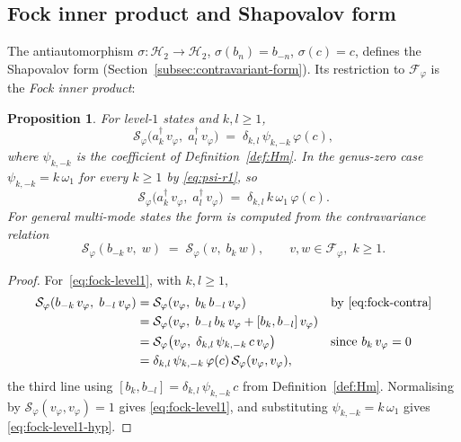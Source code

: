 \documentclass[12pt]{amsart}
\theoremstyle{plain}
\newtheorem{proposition}[theorem]{Proposition}
\theoremstyle{definition}
\newcommand{\Sf}{\mathcal{S}_\varphi} %
\newcommand{\vf}{v_\varphi}           %
\begin{document}
\subsection{Fock inner product and Shapovalov form}
\label{subsec:fock-inner-product}

The antiautomorphism $\sigma\colon \mathcal{H}_2 \to \mathcal{H}_2$,
$\sigma(b_n) = b_{-n}$, $\sigma(c) = c$, defines the Shapovalov form
(Section~\ref{subsec:contravariant-form}).
Its restriction to $\mathcal{F}_\varphi$ is the \emph{Fock inner product}:

\begin{proposition}
\label{prop:fock-ip}
For level-$1$ states and $k, l \geq 1$,
\begin{equation}
\label{eq:fock-level1}
  \Sf\bigl(a_k^\dagger\, \vf,\; a_l^\dagger\, \vf\bigr)
  \;=\;
  \delta_{k,l}\, \psi_{k,-k}\, \varphi(c),
\end{equation}
where $\psi_{k,-k}$ is the coefficient of
Definition~\textup{\ref{def:Hm}}. In the genus-zero case
$\psi_{k,-k} = k\,\omega_1$ for every $k \geq 1$ by \eqref{eq:psi-r1}, so
\begin{equation}
\label{eq:fock-level1-hyp}
  \Sf\bigl(a_k^\dagger\, \vf,\; a_l^\dagger\, \vf\bigr)
  \;=\;
  \delta_{k,l}\, k\, \omega_1 \, \varphi(c).
\end{equation}
For general multi-mode states the form is computed from the
contravariance relation
\begin{equation}
\label{eq:fock-contra}
  \Sf(b_{-k}\,v,\; w) \;=\; \Sf(v,\; b_k\,w),
  \qquad v, w \in \mathcal{F}_\varphi,\; k \geq 1.
\end{equation}
\end{proposition}
\begin{proof}
For~\eqref{eq:fock-level1}, with $k, l \geq 1$,
\begin{align*}
  \Sf(b_{-k}\,\vf,\; b_{-l}\,\vf)
  &= \Sf(\vf,\; b_k\, b_{-l}\,\vf)
     && \text{by \eqref{eq:fock-contra}} \\
  &= \Sf(\vf,\; b_{-l}\,b_k\,\vf + [b_k, b_{-l}]\,\vf) \\
  &= \Sf\bigl(\vf,\; \delta_{k,l}\, \psi_{k,-k}\, c\,\vf\bigr)
     && \text{since } b_k\,\vf = 0 \\
  &= \delta_{k,l}\, \psi_{k,-k}\, \varphi(c)\,\Sf(\vf,\vf),
\end{align*}
the third line using $[b_k, b_{-l}] = \delta_{k,l}\,\psi_{k,-k}\,c$
from Definition~\ref{def:Hm}. Normalising by $\Sf(\vf,\vf) = 1$ gives
\eqref{eq:fock-level1}, and substituting $\psi_{k,-k} = k\,\omega_1$
gives \eqref{eq:fock-level1-hyp}.
\end{proof}
\end{document}
